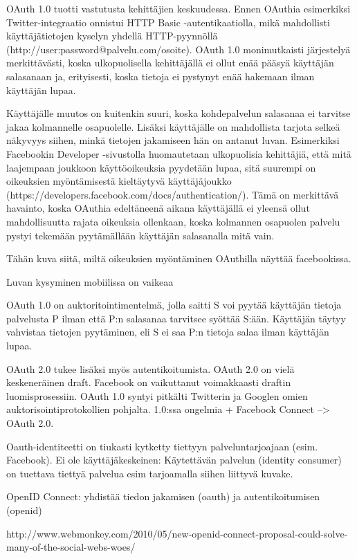 \documentclass[english,gradu]{tktltiki}
\begin{document}
OAuth 1.0 tuotti vastutusta kehittäjien keskuudessa. Ennen OAuthia esimerkiksi Twitter-integraatio onnistui HTTP Basic -autentikaatiolla, mikä mahdollisti käyttäjätietojen kyselyn yhdellä HTTP-pyynnöllä (http://user:password@palvelu.com/osoite). OAuth 1.0 monimutkaisti järjestelyä merkittävästi, koska ulkopuolisella kehittäjällä ei ollut enää pääsyä käyttäjän salasanaan ja, erityisesti, koska tietoja ei pystynyt enää hakemaan ilman käyttäjän lupaa.

Käyttäjälle muutos on kuitenkin suuri, koska kohdepalvelun salasanaa ei tarvitse jakaa kolmannelle osapuolelle. Lisäksi käyttäjälle on mahdollista tarjota selkeä näkyvyys siihen, minkä tietojen jakamiseen hän on antanut luvan. Esimerkiksi Facebookin Developer -sivustolla huomautetaan ulkopuolisia kehittäjiä, että mitä laajempaan joukkoon käyttöoikeuksia pyydetään lupaa, sitä suurempi on oikeuksien myöntämisestä kieltäytyvä käyttäjäjoukko (https://developers.facebook.com/docs/authentication/). Tämä on merkittävä havainto, koska OAuthia edeltäneenä aikana käyttäjällä ei yleensä ollut mahdollisuutta rajata oikeuksia ollenkaan, koska kolmannen osapuolen palvelu pystyi tekemään pyytämällään käyttäjän salasanalla mitä vain.


Tähän kuva siitä, miltä oikeuksien myöntäminen OAuthilla näyttää facebookissa.

Luvan kysyminen mobiilissa on vaikeaa


OAuth 1.0 on auktoritointimentelmä, jolla saitti S voi pyytää käyttäjän tietoja palvelusta P ilman että P:n salasanaa tarvitsee syöttää S:ään. Käyttäjän täytyy vahvistaa tietojen pyytäminen, eli S ei saa P:n tietoja salaa ilman käyttäjän lupaa.

OAuth 2.0 tukee lisäksi myös autentikoitumista. OAuth 2.0 on vielä keskeneräinen draft. Facebook on vaikuttanut voimakkaasti draftin luomisprosessiin. OAuth 1.0 syntyi pitkälti Twitterin ja Googlen omien auktorisointiprotokollien pohjalta. 1.0:ssa ongelmia + Facebook Connect --> OAuth 2.0.


Oauth-identiteetti on tiukasti kytketty tiettyyn palveluntarjoajaan (esim. Facebook).
Ei ole käyttäjäkeskeinen: Käytettävän palvelun (identity consumer) on tuettava tiettyä palvelua esim tarjoamalla siihen liittyvä kuvake.

OpenID Connect: yhdistää tiedon jakamisen (oauth) ja autentikoitumisen (openid)

http://www.webmonkey.com/2010/05/new-openid-connect-proposal-could-solve-many-of-the-social-webs-woes/
\end{document}
